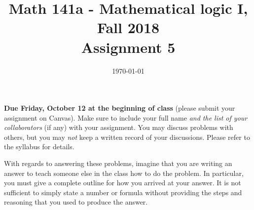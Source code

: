 \documentclass{amsart}
\title[Math 141a, Fall 2018: assignment 5]{Math 141a - Mathematical logic I, Fall 2018 \\ Assignment 5}
\date{\today}
\theoremstyle{definition}
\begin{document}

\maketitle

\textbf{Due Friday, October 12 at the beginning of class} (please submit your assignment on Canvas). Make sure to include your full name \emph{and the list of your collaborators} (if any) with your assignment. You may discuss problems with others, but you may \emph{not} keep a written record of your discussions. Please refer to the syllabus for details.

With regards to answering these problems, imagine that you are writing an answer to teach someone else in the class how to do the problem. In particular, you must give a complete outline for how you arrived at your answer. It is not sufficient to simply state a number or formula without providing the steps and reasoning that you used to produce the answer.
\end{document}
